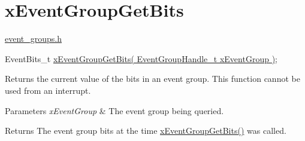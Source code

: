\hypertarget{group__xEventGroupGetBits}{\section{x\-Event\-Group\-Get\-Bits}
\label{group__xEventGroupGetBits}
}
\hyperlink{event__groups_8h}{event\-\_\-groups.\-h} 
\begin{DoxyPre}
   EventBits\_t \hyperlink{event__groups_8h_a0ae86f092fb07ccb475ae938f9a12584}{xEventGroupGetBits( EventGroupHandle\_t xEventGroup )};
\end{DoxyPre}


Returns the current value of the bits in an event group. This function cannot be used from an interrupt.


\begin{DoxyParams}{Parameters}
{\em x\-Event\-Group} & The event group being queried.\\
\hline
\end{DoxyParams}
\begin{DoxyReturn}{Returns}
The event group bits at the time \hyperlink{event__groups_8h_a0ae86f092fb07ccb475ae938f9a12584}{x\-Event\-Group\-Get\-Bits()} was called. 
\end{DoxyReturn}
